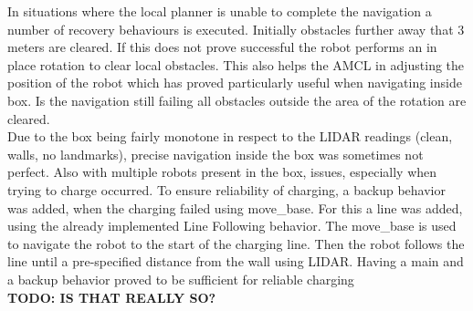 	In situations where the local planner is unable to complete the navigation a number of recovery behaviours is executed. Initially obstacles further away that 3 meters are cleared. If this does not prove successful the robot performs an in place rotation to clear local obstacles. This also helps the AMCL in adjusting the position of the robot which has proved particularly useful when navigating inside box. Is the navigation still failing all obstacles outside the area of the rotation are cleared. 
    \\
    Due to the box being fairly monotone in respect to the LIDAR readings (clean, walls, no landmarks), precise navigation inside the box was sometimes not perfect. 
    Also with multiple robots present in the box, issues, especially when trying to charge occurred. 
    To ensure reliability of charging, a backup behavior was added, when the charging failed using move{\_}base. 
    For this a line was added, using the already implemented Line Following behavior. 
    The move{\_}base is used to navigate the robot to the start of the charging line. 
    Then the robot follows the line until a pre-specified distance from the wall using LIDAR. 
    Having a main and a backup behavior proved to be sufficient for reliable charging\\
    \textbf{TODO: IS THAT REALLY SO?}


